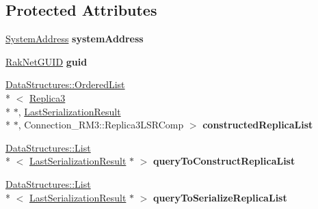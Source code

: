 \subsection*{Protected Attributes}
\begin{DoxyCompactItemize}
\item 
\hypertarget{class_rak_net_1_1_connection___r_m3_a1d0019e6dd9ce69145d809e5206e1d01}{\hyperlink{struct_rak_net_1_1_system_address}{System\-Address} {\bfseries system\-Address}}\label{class_rak_net_1_1_connection___r_m3_a1d0019e6dd9ce69145d809e5206e1d01}

\item 
\hypertarget{class_rak_net_1_1_connection___r_m3_ab70c9dee395ad6c58ef5f51146b9cd6b}{\hyperlink{struct_rak_net_1_1_rak_net_g_u_i_d}{Rak\-Net\-G\-U\-I\-D} {\bfseries guid}}\label{class_rak_net_1_1_connection___r_m3_ab70c9dee395ad6c58ef5f51146b9cd6b}

\item 
\hypertarget{class_rak_net_1_1_connection___r_m3_a081fd1a7579691a336512322d8c84bfd}{\hyperlink{class_data_structures_1_1_ordered_list}{Data\-Structures\-::\-Ordered\-List}\\*
$<$ \hyperlink{class_rak_net_1_1_replica3}{Replica3} \\*
$\ast$, \hyperlink{struct_rak_net_1_1_last_serialization_result}{Last\-Serialization\-Result} \\*
$\ast$, Connection\-\_\-\-R\-M3\-::\-Replica3\-L\-S\-R\-Comp $>$ {\bfseries constructed\-Replica\-List}}\label{class_rak_net_1_1_connection___r_m3_a081fd1a7579691a336512322d8c84bfd}

\item 
\hypertarget{class_rak_net_1_1_connection___r_m3_a2f31bc69257f17ab35d7b7eec2156898}{\hyperlink{class_data_structures_1_1_list}{Data\-Structures\-::\-List}\\*
$<$ \hyperlink{struct_rak_net_1_1_last_serialization_result}{Last\-Serialization\-Result} $\ast$ $>$ {\bfseries query\-To\-Construct\-Replica\-List}}\label{class_rak_net_1_1_connection___r_m3_a2f31bc69257f17ab35d7b7eec2156898}

\item 
\hypertarget{class_rak_net_1_1_connection___r_m3_a9dcec137136eb03f89951d6cab1556a1}{\hyperlink{class_data_structures_1_1_list}{Data\-Structures\-::\-List}\\*
$<$ \hyperlink{struct_rak_net_1_1_last_serialization_result}{Last\-Serialization\-Result} $\ast$ $>$ {\bfseries query\-To\-Serialize\-Replica\-List}}\label{class_rak_net_1_1_connection___r_m3_a9dcec137136eb03f89951d6cab1556a1}


\end{DoxyCompactItemize}
